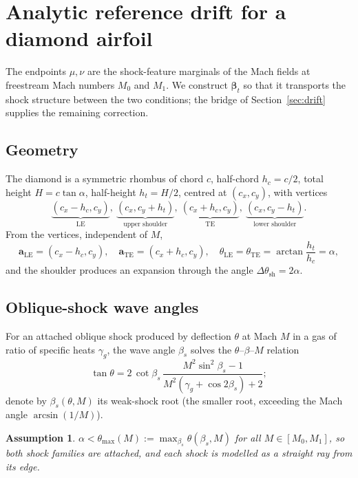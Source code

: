 \documentclass[11pt]{article}
\newtheorem{assumption}{Assumption}
\theoremstyle{remark}
\newcommand{\bt}{\boldsymbol{\beta}}
\newcommand{\av}{\mathbf{a}}
\begin{document}
\section{Analytic reference drift for a diamond airfoil}
\label{sec:diamond}

The endpoints $\mu,\nu$ are the shock-feature marginals of the Mach fields at
freestream Mach numbers $M_0$ and $M_1$. We construct $\bt_t$ so that it
transports the shock structure between the two conditions; the bridge of
Section~\ref{sec:drift} supplies the remaining correction.

\subsection{Geometry}
The diamond is a symmetric rhombus of chord $c$, half-chord $h_c=c/2$, total
height $H=c\tan\alpha$, half-height $h_t=H/2$, centred at $(c_x,c_y)$, with
vertices
\[
\underbrace{(c_x-h_c,c_y)}_{\text{LE}},\
\underbrace{(c_x,c_y+h_t)}_{\text{upper shoulder}},\
\underbrace{(c_x+h_c,c_y)}_{\text{TE}},\
\underbrace{(c_x,c_y-h_t)}_{\text{lower shoulder}} .
\]
From the vertices, independent of $M$,
\begin{equation}
\av_{\mathrm{LE}}=(c_x-h_c,c_y),\quad
\av_{\mathrm{TE}}=(c_x+h_c,c_y),\quad
\theta_{\mathrm{LE}}=\theta_{\mathrm{TE}}=\arctan\!\frac{h_t}{h_c}=\alpha,
\end{equation}
and the shoulder produces an expansion through the angle $\Delta\theta_{\mathrm{sh}}=2\alpha$.

\subsection{Oblique-shock wave angles}
For an attached oblique shock produced by deflection $\theta$ at Mach $M$ in a gas
of ratio of specific heats $\gamma_g$, the wave angle $\beta_s$ solves the $\theta$--$\beta$--$M$ relation
\begin{equation}
\label{eq:tbm}
\tan\theta=2\,\cot\beta_s\,\frac{M^2\sin^2\beta_s-1}{M^2(\gamma_g+\cos2\beta_s)+2};
\end{equation}
denote by $\beta_s(\theta,M)$ its weak-shock root (the smaller root, exceeding
the Mach angle $\arcsin(1/M)$).

\begin{assumption}
\label{ass:attached}
$\alpha<\theta_{\max}(M):=\max_{\beta_s}\theta(\beta_s,M)$ for all
$M\in[M_0,M_1]$, so both shock families are attached, and each shock is modelled
as a straight ray from its edge.
\end{assumption}
\end{document}
